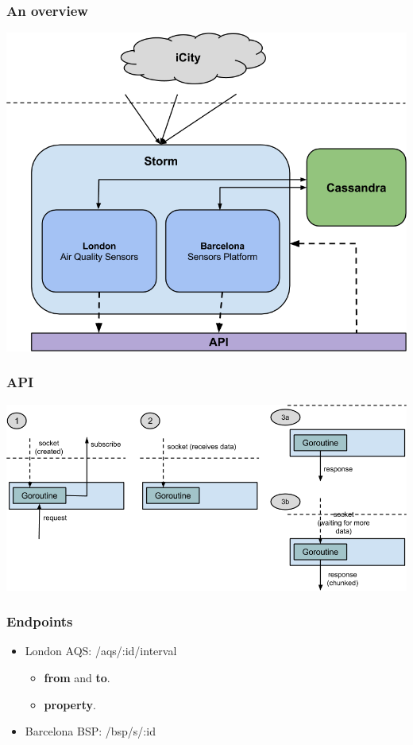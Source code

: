\documentclass[12pt]{beamer}
\begin{document}
\begin{frame}
\vfill
  \frametitle{An overview}
  \begin{center}
    \includegraphics[scale=0.4]{images/arch.png}
  \end{center}
\vfill
\end{frame}

\begin{frame}
\vfill
  \frametitle{API}
  \begin{center}
    \includegraphics[scale=0.45]{images/api.png}
  \end{center}
\vfill
\end{frame}

\begin{frame}
\vfill
  \frametitle{Endpoints}
  \begin{center}
    \begin{itemize}
      \item London AQS: /aqs/:id/interval
      \vfill
      \begin{itemize}
        \item {\bf from} and {\bf to}.
        \vfill
        \item {\bf property}.
        \vfill
      \end{itemize}
      \item Barcelona BSP: /bsp/s/:id
    \end{itemize}
  \end{center}
\vfill
\end{frame}
\end{document}
